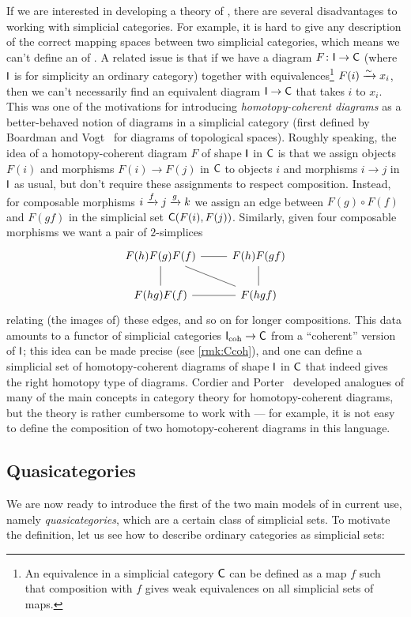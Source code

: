 \documentclass[a4paper,11pt]{article}
\begin{document}
If we are interested in developing a theory of \icats{}, there are
several disadvantages to working with simplicial categories. For
example, it is hard to give any description of the correct mapping
spaces between two simplicial categories, which means we can't define
an \icat{} of \icats{}. A related issue is that if we have a diagram
$F \colon \uI \to \uC$ (where $\textup{\textsf{I}}$ is for simplicity an ordinary
category) together with equivalences\footnote{An equivalence in a
  simplicial category $\textup{\textsf{C}}$ can be defined as a map $f$ such that
  composition with $f$ gives weak equivalences on all simplicial sets
  of maps.} $F(i) \isoto x_{i}$, then we can't necessarily find an
equivalent diagram $\uI \to \uC$ that takes $i$ to $x_{i}$. This was
one of the motivations for introducing \emph{homotopy-coherent
  diagrams} as a better-behaved notion of diagrams in a simplicial
category (first defined by Boardman and Vogt~\cite{BoardmanVogt} for
diagrams of topological spaces). Roughly speaking, the idea of a
homotopy-coherent diagram $F$ of shape $\textup{\textsf{I}}$ in $\textup{\textsf{C}}$ is that we
assign objects $F(i)$ and morphisms $F(i) \to F(j)$ in $\textup{\textsf{C}}$ to
objects $i$ and morphisms $i \to j$ in $\textup{\textsf{I}}$ as usual, but don't
require these assignments to respect composition. Instead, for
composable morphisms $i \xto{f} j \xto{g} k$ we assign an edge between
$F(g) \circ F(f)$ and $F(gf)$ in the simplicial set
$\textup{\textsf{C}}(F(i),F(j))$. Similarly, given four composable morphisms we want a
pair of $2$-simplices
\[
  \begin{tikzcd}
    F(h)F(g)F(f) \ar[d, no head] \ar[dr, no head] \ar[r, no head] & F(h)F(gf) \ar[d,no head] \\
    F(hg)F(f) \ar[r, no head] & F(hgf)
  \end{tikzcd}
\]
relating (the images of) these edges, and so on for longer
compositions. This data amounts to a functor of simplicial categories
$\uI_{\txt{coh}} \to \uC$ from a ``coherent'' version of $\textup{\textsf{I}}$; this
idea can be made precise (see \cref{rmk:Ccoh}), and one can define a
simplicial set of homotopy-coherent diagrams of shape $\textup{\textsf{I}}$ in $\textup{\textsf{C}}$
that indeed gives the right homotopy type of diagrams. Cordier and
Porter~\cite{CordierPorter} developed analogues of many of the main
concepts in category theory for homotopy-coherent diagrams, but the
theory is rather cumbersome to work with --- for example, it is not
easy to define the composition of two homotopy-coherent diagrams in
this language.

\subsection{Quasicategories}\label{subsec:qcat}
We are now ready to introduce the first of the two main models of
\icats{} in current use, namely \emph{quasicategories}, which are a
certain class of simplicial sets. To motivate the definition, let us
see how to describe ordinary categories as simplicial sets:
\end{document}
